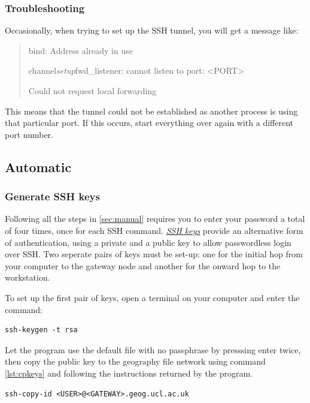 \documentclass[a4paper]{article}
\begin{document}
\subsubsection{Troubleshooting}
\label{sec:trouble}
Occasionally, when trying to set up the SSH tunnel, you will get a message like:
\begin{quote}
bind: Address already in use

channel\emph{setup}fwd\_listener: cannot listen to port: \textless{}PORT\textgreater{}

Could not request local forwarding
\end{quote}

This means that the tunnel could not be established as another process is using that particular port.
If this occurs, start everything over again with a different port number.

\subsection{Automatic}
\label{sec:auto}

\subsubsection{Generate SSH keys}
\label{sec:sshkeys}
Following all the steps in \ref{sec:manual} requires you to enter your password a total of four times, once for each SSH command.
\href{https://wiki.archlinux.org/index.php/SSH_keys}{\emph{SSH keys}} provide an alternative form of authentication, using a private and a public key to allow passwordless login over SSH.
Two seperate pairs of keys must be set-up: one for the initial hop from your computer to the gateway node and another for the onward hop to the workstation.

To set up the first pair of keys, open a terminal on your computer and enter the command:
\begin{lstlisting}[caption={Generate SSH keys}, label={lst:genkeys}]
ssh-keygen -t rsa
\end{lstlisting}
Let the program use the default file with no passphrase by presssing enter twice, then copy the public key to the geography file network using command \ref{lst:cpkeys} and following the instructions returned by the program.

\begin{lstlisting}[caption={Copy public key to geography file system}, label={lst:cpkeys}]
ssh-copy-id <USER>@<GATEWAY>.geog.ucl.ac.uk
\end{lstlisting}
\end{document}

